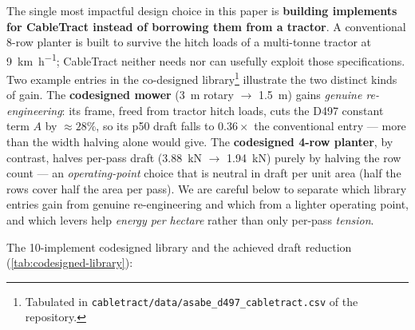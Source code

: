\documentclass[11pt,a4paper]{article}
\begin{document}
The single most impactful design choice in this paper is \textbf{building implements for CableTract instead of borrowing them from a tractor}. A conventional 8-row planter is built to survive the hitch loads of a multi-tonne tractor at \SI{9}{\kilo\meter\per\hour}; CableTract neither needs nor can usefully exploit those specifications. Two example entries in the co-designed library\footnote{Tabulated in \texttt{cabletract/data/asabe\_d497\_cabletract.csv} of the repository.} illustrate the two distinct kinds of gain. The \textbf{codesigned mower} (\SI{3}{\meter} rotary $\to$ \SI{1.5}{\meter}) gains \emph{genuine re-engineering}: its frame, freed from tractor hitch loads, cuts the D497 constant term $A$ by ${\approx}28\%$, so its \gls{p50} draft falls to $0.36\times$ the conventional entry --- more than the width halving alone would give. The \textbf{codesigned 4-row planter}, by contrast, halves per-pass draft (\SI{3.88}{\kilo\newton} $\to$ \SI{1.94}{\kilo\newton}) purely by halving the row count --- an \emph{operating-point} choice that is neutral in draft per unit area (half the rows cover half the area per pass). We are careful below to separate which library entries gain from genuine re-engineering and which from a lighter operating point, and which levers help \emph{energy per hectare} rather than only per-pass \emph{tension}.

The 10-implement codesigned library and the achieved draft reduction (\cref{tab:codesigned-library}):
\end{document}
